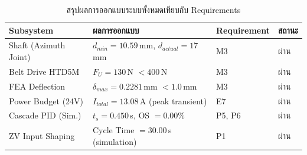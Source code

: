 \begin{table}[H]
  \centering
  \caption{สรุปผลการออกแบบระบบทั้งหมดเทียบกับ Requirements}
  \label{tab:design_summary}
  \small
  \begin{tabular}{>{\raggedright\arraybackslash}p{3.5cm} >{\raggedright\arraybackslash}p{3.5cm} >{\raggedright\arraybackslash}p{3.5cm} >{\raggedright\arraybackslash}p{3.0cm}}
    \toprule
    Subsystem & ผลการออกแบบ & Requirement & สถานะ \\
    \midrule
    Shaft (Azimuth Joint) & $d_{min} = 10.59$\,mm, $d_{actual} = 17$\,mm & M3 & ผ่าน \\
    Belt Drive HTD5M      & $F_U = 130$\,N $< 400$\,N                    & M3 & ผ่าน \\
    FEA Deflection        & $\delta_{max} = 0.2281$\,mm $< 1.0$\,mm      & M3 & ผ่าน \\
    Power Budget (24V)    & $I_{total} = 13.08$\,A (peak transient)       & E7 & ผ่าน \\
    Cascade PID (Sim.)    & $t_s = 0.450$\,s, OS $= 0.00\%$              & P5, P6 & ผ่าน \\
    ZV Input Shaping      & Cycle Time $= 30.00$\,s (simulation)          & P1 & ผ่าน \\
    \bottomrule
  \end{tabular}
\end{table}